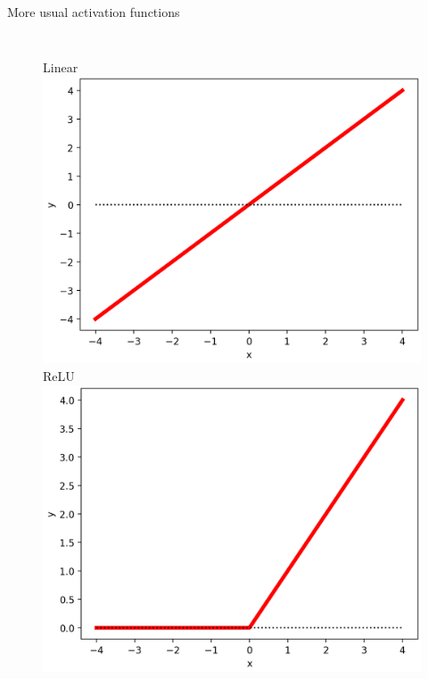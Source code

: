 \documentclass[handout]{beamer}
\begin{document}
\begin{frame}{More usual activation functions}
\begin{columns}
    \begin{figure}
        \centering
        Linear\\
        \includegraphics[width=.85\textwidth]{fig/L2/activ-linear.png}\\
        ReLU\\
        \includegraphics[width=.85\textwidth]{fig/L2/activ-relu.png}\\


\end{figure}
\end{columns}
\end{frame}
\end{document}
